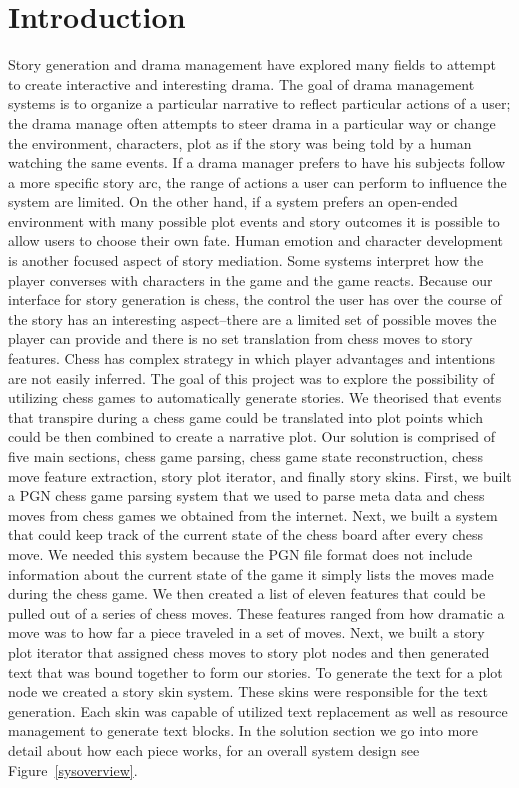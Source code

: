\documentclass[journal]{./IEEEtran}
\begin{document}
\section{Introduction}
Story generation and drama management have explored many fields to attempt to create interactive and interesting drama. The goal of drama management systems is to organize a particular narrative to reflect particular actions of a user; the drama manage often attempts to steer drama in a particular way or change the environment, characters, plot as if the story was being told by a human watching the same events. If a drama manager prefers to have his subjects follow a more specific story arc, the range of actions a user can perform to influence the system are limited. On the other hand, if a system prefers an open-ended environment with many possible plot events and story outcomes it is possible to allow users to choose their own fate. Human emotion and character development is another focused aspect of story mediation. Some systems interpret how the player converses with characters in the game and the game reacts.
Because our interface for story generation is chess, the control the user has over the course of the story has an interesting aspect--there are a limited set of possible moves the player can provide and there is no set translation from chess moves to story features. Chess has complex strategy in which player advantages and intentions are not easily inferred. The goal of this project was to explore the possibility of utilizing chess games to automatically generate stories. We theorised that events that transpire during a chess game could be translated into plot points which could be then combined to create a narrative plot. Our solution is comprised of five main sections, chess game parsing, chess game state reconstruction, chess move feature extraction, story plot iterator, and finally story skins.
First, we built a PGN chess game parsing system that we used to parse meta data and chess moves from chess games we obtained from the internet. Next, we built a system that could keep track of the current state of the chess board after every chess move. We needed this system because the PGN file format does not include information about the current state of the game it simply lists the moves made during the chess game. We then created a list of eleven features that could be pulled out of a series of chess moves. These features ranged from how dramatic a move was to how far a piece traveled in a set of moves. Next, we built a story plot iterator that assigned chess moves to story plot nodes and then generated text that was bound together to form our stories. To generate the text for a plot node we created a story skin system. These skins were responsible for the text generation. Each skin was capable of utilized text replacement as well as resource management to generate text blocks. In the solution section we go into more detail about how each piece works, for an overall system design see Figure~\ref{sysoverview}.
\end{document}
